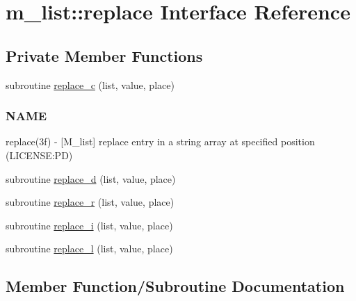 \hypertarget{interfacem__list_1_1replace}{}\section{m\+\_\+list\+:\+:replace Interface Reference}
\label{interfacem__list_1_1replace}
\subsection*{Private Member Functions}
\begin{DoxyCompactItemize}
\item 
subroutine \mbox{\hyperlink{interfacem__list_1_1replace_aad4e731687891682a6e8f492aa9d0ad5}{replace\+\_\+c}} (list, value, place)
\begin{DoxyCompactList}\small\item\em \subsubsection*{N\+A\+ME}

replace(3f) -\/ \mbox{[}M\+\_\+list\mbox{]} replace entry in a string array at specified position (L\+I\+C\+E\+N\+SE\+:PD) \end{DoxyCompactList}\item 
subroutine \mbox{\hyperlink{interfacem__list_1_1replace_a4335c634f2c3a245bed87574c22a9d40}{replace\+\_\+d}} (list, value, place)
\item 
subroutine \mbox{\hyperlink{interfacem__list_1_1replace_ad5be185ea029e2f1c2613e55babc8bd1}{replace\+\_\+r}} (list, value, place)
\item 
subroutine \mbox{\hyperlink{interfacem__list_1_1replace_a36315bb68af9cd1845a2d2b9c79a9cb2}{replace\+\_\+i}} (list, value, place)
\item 
subroutine \mbox{\hyperlink{interfacem__list_1_1replace_a0070f232e6ce6a3cff06e1ba4244b075}{replace\+\_\+l}} (list, value, place)
\end{DoxyCompactItemize}


\subsection{Member Function/\+Subroutine Documentation}
\mbox{\label{interfacem__list_1_1replace_aad4e731687891682a6e8f492aa9d0ad5}} 
